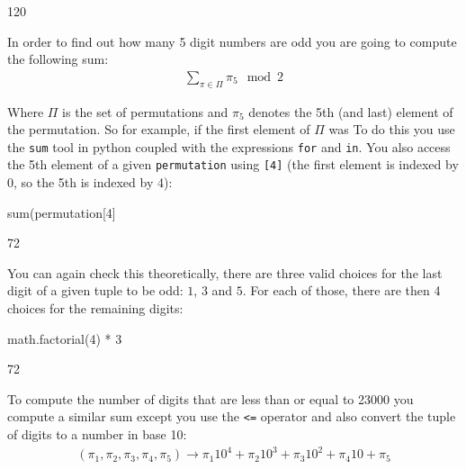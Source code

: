 \begin{raw}
120
\end{raw}





In order to find out how many 5 digit numbers are odd you are going to compute
the following sum:
\begin{equation*}
\begin{split}
    \sum_{\pi \in \Pi} \pi_5 \mod 2
\end{split}
\end{equation*}

Where \(\Pi\) is the set of permutations and \(\pi_5\) denotes the 5th (and last)
element of the permutation. So for example, if the first element of \(\Pi\) was
To do this you use the \texttt{sum} tool in python coupled with the expressions
\texttt{for}
and \texttt{in}. You also access the 5th element of a given \texttt{permutation}
using \texttt{[4]} (the
first element is indexed by 0, so the 5th is indexed by 4):




\begin{pyin}
sum(permutation[4] %
\end{pyin}





\begin{raw}
72
\end{raw}





You can again check this theoretically, there are three valid choices for the
last digit of a given tuple to be odd: \(1\), \(3\) and \(5\). For each of those,
there are then 4 choices for the remaining digits:




\begin{pyin}
math.factorial(4) * 3
\end{pyin}





\begin{raw}
72
\end{raw}

To compute the number of digits that are less than or equal to 23000 you compute a
similar sum except you use the \texttt{<=} operator and also convert the tuple of digits
to a number in base 10:
\begin{equation*}
\begin{split}
    (\pi_1, \pi_2, \pi_3, \pi_4, \pi_5) \to \pi_1 10 ^ 4 + \pi_2 10 ^ 3 + \pi_3 10 ^ 2 + \pi_4 10 + \pi_5
\end{split}
\end{equation*}

